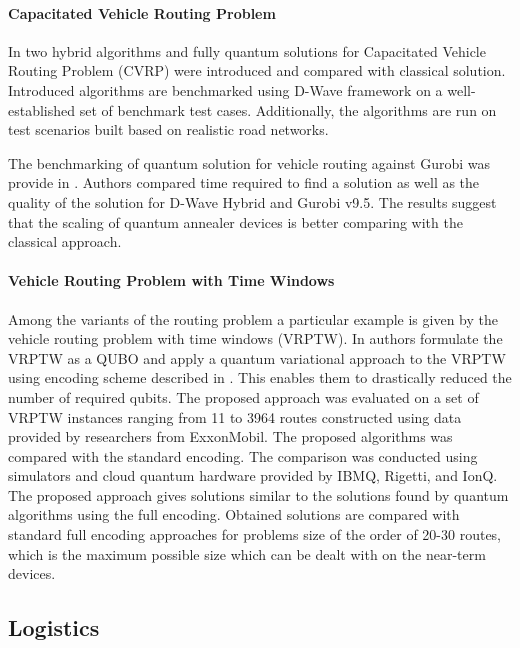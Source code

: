 \documentclass[a4paper,11pt]{article}
\begin{document}
\paragraph{Capacitated Vehicle Routing Problem} In \cite{borowski2020new} two hybrid algorithms and fully quantum solutions for Capacitated Vehicle Routing Problem (CVRP) were introduced and compared with classical solution. Introduced algorithms are benchmarked using D-Wave framework on a well-established set of benchmark test cases. Additionally, the algorithms are run on test scenarios built based on realistic road networks.

The benchmarking of quantum solution for vehicle routing against Gurobi was provide in \cite{anil2022performance}. Authors compared time required to find a solution as well as the quality of the solution for D-Wave Hybrid and  Gurobi v9.5. The results suggest that the scaling of quantum annealer devices is better comparing with the classical approach.


\paragraph{Vehicle Routing Problem with Time Windows}
Among the variants of the routing problem a particular example is given by the
vehicle routing problem with time windows (VRPTW). In \cite{leonidas2023qubit} authors formulate the VRPTW as a QUBO and apply a quantum variational approach to the VRPTW using encoding scheme described in \cite{vikstaal2020applying}. This enables them to drastically reduced the number of required qubits. The proposed approach was evaluated on a set of VRPTW instances ranging from 11 to 3964 routes constructed using data provided by researchers from ExxonMobil. The proposed algorithms was compared with the standard encoding. The comparison was conducted using simulators and cloud quantum hardware provided by IBMQ, Rigetti, and IonQ. The proposed approach gives solutions similar to the solutions found by quantum algorithms using the full encoding. Obtained solutions are compared with standard full encoding approaches for problems size  of the order of 20-30 routes, which is the maximum possible size which can be dealt with on the near-term devices.

\subsection{Logistics}
\end{document}

